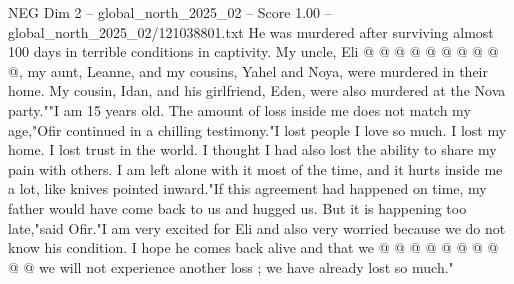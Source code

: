\begin{textsample}{NEG Dim 2 – global\_north\_2025\_02 – Score 1.00 – global\_north\_2025\_02/121038801.txt}
He was murdered after surviving almost 100 days in terrible conditions in captivity.
My uncle, Eli @ @ @ @ @ @ @ @ @ @, my aunt, Leanne, and my cousins, Yahel and Noya, were murdered in their home.
My cousin, Idan, and his girlfriend, Eden, were also murdered at the Nova party.""I am 15 years old.
The amount of loss inside me does not match my age,"Ofir continued in a chilling testimony."I lost people I love so much.
I lost my home.
I lost trust in the world.
I thought I had also lost the ability to share my pain with others.
I am left alone with it most of the time, and it hurts inside me a lot, like knives pointed inward."If this agreement had happened on time, my father would have come back to us and hugged us.
But it is happening too late,"said Ofir."I am very excited for Eli and also very worried because we do not know his condition.
I hope he comes back alive and that we @ @ @ @ @ @ @ @ @ @ we will not experience another loss ; we have already lost so much."

\end{textsample}

